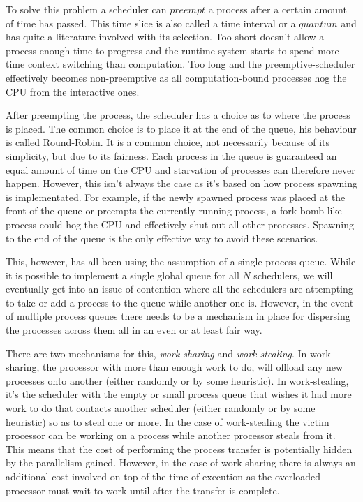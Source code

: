 To solve this problem a scheduler can $preempt$ a process after a certain amount
of time has passed. This time slice is also called a time interval or a $quantum$
and has quite a literature involved with its selection. 
Too short doesn't allow a process enough time to progress and the runtime system
starts to spend more time context switching than computation. Too long and the
preemptive-scheduler effectively becomes non-preemptive as all computation-bound
processes hog the CPU from the interactive ones.

After preempting the process, the scheduler has a choice as to where the process
is placed. The common choice is to place it at the end of the queue, his 
behaviour is called Round-Robin. It is a common choice, not necessarily because
of its simplicity, but due to its fairness. Each process in the queue is 
guaranteed an equal amount of time on the CPU and starvation of processes can 
therefore never happen. However, this isn't always the case as it's based on how
process spawning is implementated. For example, if the newly spawned process
was placed at the front of the queue or preempts the currently running process,
a fork-bomb like process could hog the CPU and effectively shut out all other 
processes. Spawning to the end of the queue is the only effective way to avoid
these scenarios.

This, however, has all been using the assumption of a single process queue. While
it is possible to implement a single global queue for all $N$ schedulers, we will
eventually get into an issue of contention where all the schedulers are 
attempting to take or add a process to the queue while another one is. However,
in the event of multiple process queues there needs to be a mechanism in place 
for dispersing the processes across them all in an even or at least fair way.

There are two mechanisms for this, \emph{work-sharing} and 
\emph{work-stealing}. In work-sharing, the processor with more than enough work
to do, will offload any new processes onto another (either randomly or by some
heuristic). In work-stealing, it's the scheduler with the empty or small process 
queue that wishes it had more work to do that contacts another scheduler (either 
randomly or by some heuristic) so as to steal one or more. In the case of 
work-stealing the victim processor can be working on a process while another
processor steals from it. This means that the cost of performing the process
transfer is potentially hidden by the parallelism gained. However, in the case 
of work-sharing there is always an additional cost involved on top of the time
of execution as the overloaded processor must wait to work until after the 
transfer is complete.

